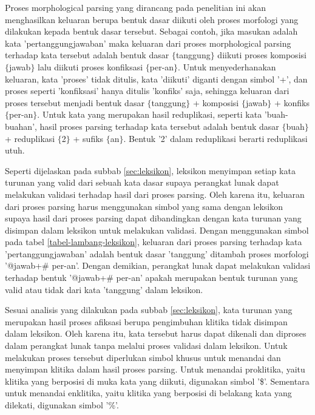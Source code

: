 Proses morphological parsing yang dirancang pada penelitian ini akan menghasilkan keluaran berupa bentuk dasar diikuti oleh proses morfologi yang dilakukan kepada bentuk dasar tersebut. Sebagai contoh, jika masukan adalah kata 'pertanggungjawaban' maka keluaran dari proses morphological parsing terhadap kata tersebut adalah bentuk dasar $\lbrace$tanggung$\rbrace$ diikuti proses komposisi $\lbrace$jawab$\rbrace$ lalu diikuti proses konfiksasi $\lbrace$per-an$\rbrace$. Untuk menyederhanakan keluaran, kata 'proses' tidak ditulis, kata 'diikuti' diganti dengan simbol '+', dan proses seperti 'konfiksasi' hanya ditulis 'konfiks' saja, sehingga keluaran dari proses tersebut menjadi bentuk dasar $\lbrace$tanggung$\rbrace$ + komposisi $\lbrace$jawab$\rbrace$ + konfiks $\lbrace$per-an$\rbrace$. Untuk kata yang merupakan hasil reduplikasi, seperti kata 'buah-buahan', hasil proses parsing terhadap kata tersebut adalah bentuk dasar $\lbrace$buah$\rbrace$ + reduplikasi $\lbrace$2$\rbrace$ + sufiks $\lbrace$an$\rbrace$. Bentuk '2' dalam reduplikasi berarti reduplikasi utuh.

Seperti dijelaskan pada subbab \ref{sec:leksikon}, leksikon menyimpan setiap kata turunan yang valid dari sebuah kata dasar supaya perangkat lunak dapat melakukan validasi terhadap hasil dari proses parsing. Oleh karena itu, keluaran dari proses parsing harus menggunakan simbol yang sama dengan leksikon supaya hasil dari proses parsing dapat dibandingkan dengan kata turunan yang disimpan dalam leksikon untuk melakukan validasi. Dengan menggunakan simbol pada tabel \ref{tabel-lambang-leksikon}, keluaran dari proses parsing terhadap kata 'pertanggungjawaban' adalah bentuk dasar 'tanggung' ditambah proses morfologi '@jawab+\# per-an'. Dengan demikian, perangkat lunak dapat melakukan validasi terhadap bentuk '@jawab+\# per-an' apakah merupakan bentuk turunan yang valid atau tidak dari kata 'tanggung' dalam leksikon.

Sesuai analisis yang dilakukan pada subbab \ref{sec:leksikon}, kata turunan yang merupakan hasil proses afiksasi berupa pengimbuhan klitika tidak disimpan dalam leksikon. Oleh karena itu, kata tersebut harus dapat dikenali dan diproses dalam perangkat lunak tanpa melalui proses validasi dalam leksikon. Untuk melakukan proses tersebut diperlukan simbol khusus untuk menandai dan menyimpan klitika dalam hasil proses parsing. Untuk menandai proklitika, yaitu klitika yang berposisi di muka kata yang diikuti, digunakan simbol '\$'. Sementara untuk menandai enklitika, yaitu klitika yang berposisi di belakang kata yang dilekati, digunakan simbol '\%'.

